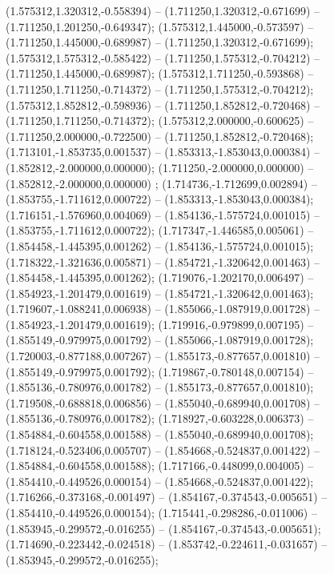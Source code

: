  (1.575312,1.320312,-0.558394) -- (1.711250,1.320312,-0.671699) -- (1.711250,1.201250,-0.649347);
 (1.575312,1.445000,-0.573597) -- (1.711250,1.445000,-0.689987) -- (1.711250,1.320312,-0.671699);
 (1.575312,1.575312,-0.585422) -- (1.711250,1.575312,-0.704212) -- (1.711250,1.445000,-0.689987);
 (1.575312,1.711250,-0.593868) -- (1.711250,1.711250,-0.714372) -- (1.711250,1.575312,-0.704212);
 (1.575312,1.852812,-0.598936) -- (1.711250,1.852812,-0.720468) -- (1.711250,1.711250,-0.714372);
 (1.575312,2.000000,-0.600625) -- (1.711250,2.000000,-0.722500) -- (1.711250,1.852812,-0.720468);
 (1.713101,-1.853735,0.001537) -- (1.853313,-1.853043,0.000384) -- (1.852812,-2.000000,0.000000);
 (1.711250,-2.000000,0.000000) -- (1.852812,-2.000000,0.000000) ;
 (1.714736,-1.712699,0.002894) -- (1.853755,-1.711612,0.000722) -- (1.853313,-1.853043,0.000384);
 (1.716151,-1.576960,0.004069) -- (1.854136,-1.575724,0.001015) -- (1.853755,-1.711612,0.000722);
 (1.717347,-1.446585,0.005061) -- (1.854458,-1.445395,0.001262) -- (1.854136,-1.575724,0.001015);
 (1.718322,-1.321636,0.005871) -- (1.854721,-1.320642,0.001463) -- (1.854458,-1.445395,0.001262);
 (1.719076,-1.202170,0.006497) -- (1.854923,-1.201479,0.001619) -- (1.854721,-1.320642,0.001463);
 (1.719607,-1.088241,0.006938) -- (1.855066,-1.087919,0.001728) -- (1.854923,-1.201479,0.001619);
 (1.719916,-0.979899,0.007195) -- (1.855149,-0.979975,0.001792) -- (1.855066,-1.087919,0.001728);
 (1.720003,-0.877188,0.007267) -- (1.855173,-0.877657,0.001810) -- (1.855149,-0.979975,0.001792);
 (1.719867,-0.780148,0.007154) -- (1.855136,-0.780976,0.001782) -- (1.855173,-0.877657,0.001810);
 (1.719508,-0.688818,0.006856) -- (1.855040,-0.689940,0.001708) -- (1.855136,-0.780976,0.001782);
 (1.718927,-0.603228,0.006373) -- (1.854884,-0.604558,0.001588) -- (1.855040,-0.689940,0.001708);
 (1.718124,-0.523406,0.005707) -- (1.854668,-0.524837,0.001422) -- (1.854884,-0.604558,0.001588);
 (1.717166,-0.448099,0.004005) -- (1.854410,-0.449526,0.000154) -- (1.854668,-0.524837,0.001422);
 (1.716266,-0.373168,-0.001497) -- (1.854167,-0.374543,-0.005651) -- (1.854410,-0.449526,0.000154);
 (1.715441,-0.298286,-0.011006) -- (1.853945,-0.299572,-0.016255) -- (1.854167,-0.374543,-0.005651);
 (1.714690,-0.223442,-0.024518) -- (1.853742,-0.224611,-0.031657) -- (1.853945,-0.299572,-0.016255);
